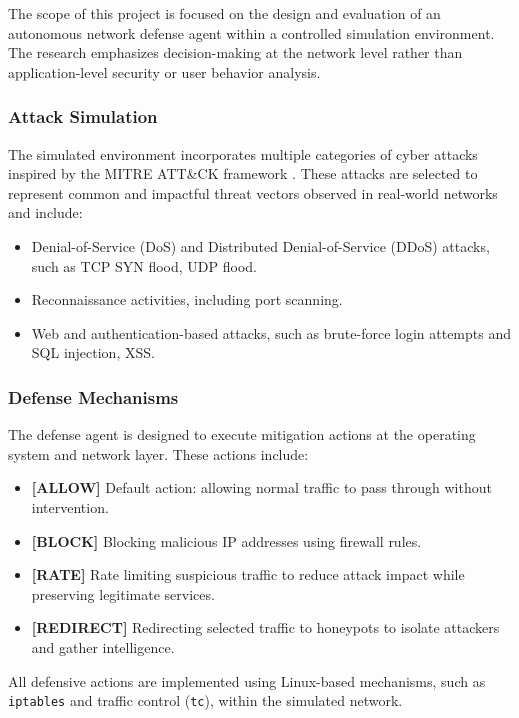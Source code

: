 \documentclass[12pt,a4paper]{report}
\begin{document}
The scope of this project is focused on the design and evaluation of an autonomous network defense agent within a controlled simulation environment.
The research emphasizes decision-making at the network level rather than application-level security or user behavior analysis.

\subsubsection{Attack Simulation}

The simulated environment incorporates multiple categories of cyber attacks inspired by the MITRE ATT\&CK framework \cite{mitreAttack2023}.
These attacks are selected to represent common and impactful threat vectors observed in real-world networks and include:

\begin{itemize}
    \item Denial-of-Service (DoS) and Distributed Denial-of-Service (DDoS) attacks, such as TCP SYN flood, UDP flood.
    \item Reconnaissance activities, including port scanning.
    \item Web and authentication-based attacks, such as brute-force login attempts and SQL injection, XSS.
\end{itemize}

\subsubsection{Defense Mechanisms}

The defense agent is designed to execute mitigation actions at the operating system and network layer.
These actions include:

\begin{itemize}
    \item \textbf{[ALLOW]} Default action: allowing normal traffic to pass through without intervention.
    \item \textbf{[BLOCK]} Blocking malicious IP addresses using firewall rules.
    \item \textbf{[RATE]} Rate limiting suspicious traffic to reduce attack impact while preserving legitimate services.
    \item \textbf{[REDIRECT]} Redirecting selected traffic to honeypots to isolate attackers and gather intelligence.
\end{itemize}

All defensive actions are implemented using Linux-based mechanisms, such as \texttt{iptables} and traffic control (\texttt{tc}), within the simulated network.
\end{document}
